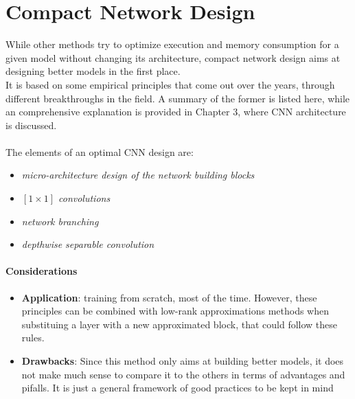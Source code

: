 \section{Compact Network Design}
While other methods try to optimize execution and memory consumption for a given model without changing its architecture, compact network design aims at designing better models in the first place. 
\\
It is based on some empirical principles that come out over the years, through different breakthroughs in the field. A summary of the former is listed here, while an comprehensive explanation is provided in Chapter 3, where CNN architecture is discussed. 
\\
\\
The elements of an optimal CNN design are:
\begin{itemize}
    \item \emph{micro-architecture design of the network building blocks}
    
    \item \emph{$[1 \times 1]$ convolutions}
    
    \item \emph{network branching}
    
    \item \emph{depthwise separable convolution}
    
\end{itemize}



\paragraph{Considerations}
\begin{itemize}
    \item \textbf{Application}: training from scratch, most of the time. However, these principles can be combined with low-rank approximations methods when substituing a layer with a new approximated block, that could follow these rules. 
    
    \item \textbf{Drawbacks}: Since this method only aims at building better models, it does not make much sense to compare it to the others in terms of advantages and pifalls. It is just a general framework of good practices to be kept in mind
\end{itemize}



